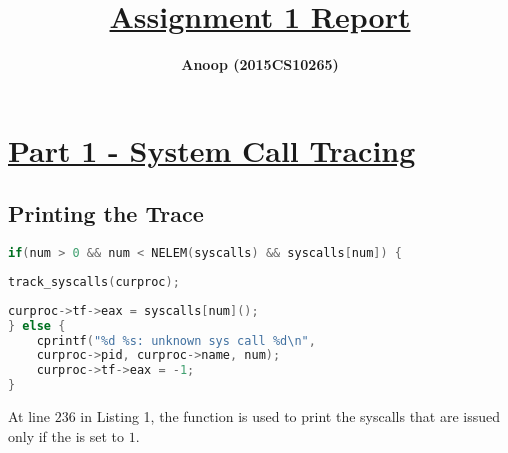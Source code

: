 \documentclass[12pt]{article}
\title{\underline{\textbf{Assignment 1 Report}}}
\author{\textbf{Anoop (2015CS10265)}}
\begin{document}
\maketitle

\section*{\underline{Part 1 - System Call Tracing}}
\subsection*{Printing the Trace}
\begin{addmargin}[0.7in]{0in}
\begin{lstlisting}[language=C,firstnumber=235,caption=Modification in ``{\ttfamily{syscall}}" function - {\ttfamily{syscall.c}},frame=single]
if(num > 0 && num < NELEM(syscalls) && syscalls[num]) {
\end{lstlisting}

\vspace{-\baselineskip}
\vspace{0.2mm}
\begin{lstlisting}[language=C,firstnumber=236,frame=single,backgroundcolor=\color{cream}]
    track_syscalls(curproc);
\end{lstlisting}

\vspace{-\baselineskip}
\vspace{0.2mm}
\begin{lstlisting}[language=C,firstnumber=237,frame=single]
    curproc->tf->eax = syscalls[num]();
} else {
    cprintf("%d %s: unknown sys call %d\n",
    curproc->pid, curproc->name, num);
    curproc->tf->eax = -1;
}
\end{lstlisting}
\end{addmargin}

\vspace{5mm}
\begin{addmargin}[0.1in]{0in}
    At line $236$ in Listing 1, the function {} is used to print the syscalls that are issued only if the {} is set to $1$.
\end{addmargin}
\vspace{5mm}
\end{document}

